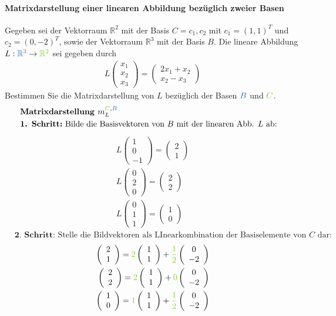 \documentclass[12pt,a4paper]{article}%
\numberwithin{equation}{section}
\newcommand{\R}{\mathbb{R}} %
\newcommand{\subsubsubsection}{\paragraph}
\def\colGreen#1{\begingroup\color{LimeGreen}{#1}\endgroup}
\def\colBlue#1{\begingroup\color{NavyBlue}{#1}\endgroup}
\def\vecT#1{\left(\begin{array}{c} #1 \end{array}\right)}
\numberwithin{equation}{subsection}
\begin{document}
		   \subsubsubsection{Matrixdarstellung einer linearen Abbildung bezüglich zweier Basen}
		   Gegeben sei der Vektorraum $\R^2$ mit der Basis $C = {c_1, c_2}$ mit $c_1 = (1,1)^T$ und $c_2 = (0,-2)^T$, sowie der Vektorraum $\R^3$ mit der Basis $B$. Die lineare Abbildung $L: \colBlue{\R^3} \rightarrow \colGreen{\R^2}$ sei gegeben durch
		   \begin{align*}
		     L\left(\begin{array}{c} x_1 \\ x_2 \\ x_3  \end{array}\right) 
		     = \left(\begin{array}{c} 2x_1+x_2 \\ x_2 - x_3  \end{array} \right)
		   \end{align*}
		   Bestimmen Sie die Matrixdarstellung von $L$ bezüglich der Basen $\colBlue{B}$ und $\colGreen{C}$.
		   \begin{align*}
		     &\textbf{Matrixdarstellung } m_L^{\colGreen{C},\colBlue{B}} &\nonumber \\
		     &\textbf{1. Schritt:} \text{ Bilde die Basisvektoren von $B$ mit der linearen Abb. $L$ ab:}&
		   \end{align*}
		   \begin{align}
		     L\vecT{1\\0\\-1} = \vecT{2\\1} \nonumber \\
		     L\vecT{0\\2\\0} = \vecT{2\\2} \nonumber \\
		     L\vecT{0\\1\\1} = \vecT{1\\0} \nonumber 
		  \end{align}
		  \begin{align*}
		     &\textbf{2. Schritt: } \text{Stelle die Bildvektoren als LInearkombination der Basiselemente von $C$ dar:}& \nonumber 
		  \end{align*}
		  \begin{align}
		     \vecT{2\\1} = \colGreen{2}\vecT{1\\1} + \colGreen{\frac{1}{2}} \vecT{0\\-2} \nonumber\\
		     \vecT{2\\2} = \colGreen{2}\vecT{1\\1} + \colGreen{0} \vecT{0\\-2} \nonumber\\
		     \vecT{1\\0} = \colGreen{1}\vecT{1\\1} + \colGreen{\frac{1}{2}} \vecT{0\\-2} \nonumber
		  \end{align}
\end{document}

